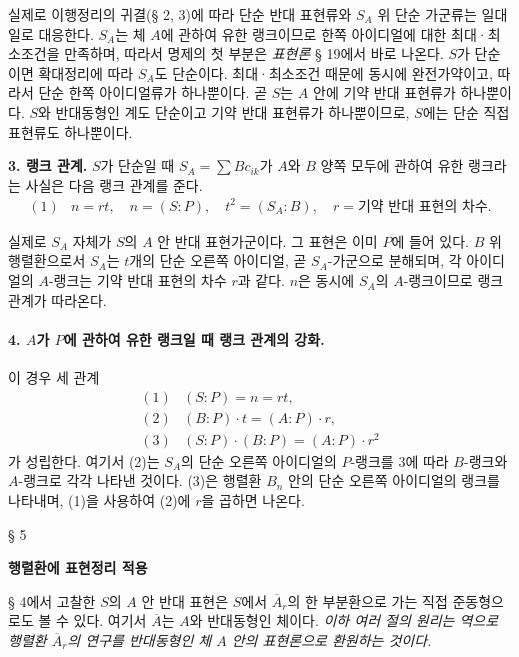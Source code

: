 실제로 이행정리의 귀결(§ 2, 3)에 따라 단순 반대 표현류와 \(S_A\) 위 단순 가군류는 일대일로 대응한다. \(S_A\)는 체 \(A\)에 관하여 유한 랭크이므로 한쪽 아이디얼에 대한 최대·최소조건을 만족하며, 따라서 명제의 첫 부분은 \emph{표현론} § 19에서 바로 나온다. \(S\)가 단순이면 확대정리에 따라 \(S_A\)도 단순이다. 최대·최소조건 때문에 동시에 완전가약이고, 따라서 단순 한쪽 아이디얼류가 하나뿐이다. 곧 \(S\)는 \(A\) 안에 기약 반대 표현류가 하나뿐이다. \(S\)와 반대동형인 계도 단순이고 기약 반대 표현류가 하나뿐이므로, \(S\)에는 단순 직접 표현류도 하나뿐이다.

\noindent\textbf{3. 랭크 관계.} \(S\)가 단순일 때 \(S_A=\sum Bc_{ik}\)가 \(A\)와 \(B\) 양쪽 모두에 관하여 유한 랭크라는 사실은 다음 랭크 관계를 준다.
\[
\begin{array}{rl}
(1)&n=rt,\quad
n=(S:P),\quad t^2=(S_A:B),\quad
r=\text{기약 반대 표현의 차수}.
\end{array}
\]

실제로 \(S_A\) 자체가 \(S\)의 \(A\) 안 반대 표현가군이다. 그 표현은 이미 \(P\)에 들어 있다. \(B\) 위 행렬환으로서 \(S_A\)는 \(t\)개의 단순 오른쪽 아이디얼, 곧 \(S_A\)-가군으로 분해되며, 각 아이디얼의 \(A\)-랭크는 기약 반대 표현의 차수 \(r\)과 같다. \(n\)은 동시에 \(S_A\)의 \(A\)-랭크이므로 랭크 관계가 따라온다.

\paragraph{4. \(A\)가 \(P\)에 관하여 유한 랭크일 때 랭크 관계의 강화.}
이 경우 세 관계
\[
\begin{array}{rl}
(1)&(S:P)=n=rt,\\
(2)&(B:P)\cdot t=(A:P)\cdot r,\\
(3)&(S:P)\cdot(B:P)=(A:P)\cdot r^2
\end{array}
\]
가 성립한다. 여기서 (2)는 \(S_A\)의 단순 오른쪽 아이디얼의 \(P\)-랭크를 3에 따라 \(B\)-랭크와 \(A\)-랭크로 각각 나타낸 것이다. (3)은 행렬환 \(B_n\) 안의 단순 오른쪽 아이디얼의 랭크를 나타내며, (1)을 사용하여 (2)에 \(r\)을 곱하면 나온다.

\begin{center}
§ 5

\textbf{행렬환에 표현정리 적용}
\end{center}

§ 4에서 고찰한 \(S\)의 \(A\) 안 반대 표현은 \(S\)에서 \(\overline A_r\)의 한 부분환으로 가는 직접 준동형으로도 볼 수 있다. 여기서 \(\overline A\)는 \(A\)와 반대동형인 체이다. \emph{이하 여러 절의 원리는 역으로 행렬환 \(\overline A_r\)의 연구를 반대동형인 체 \(A\) 안의 표현론으로 환원하는 것이다.}

